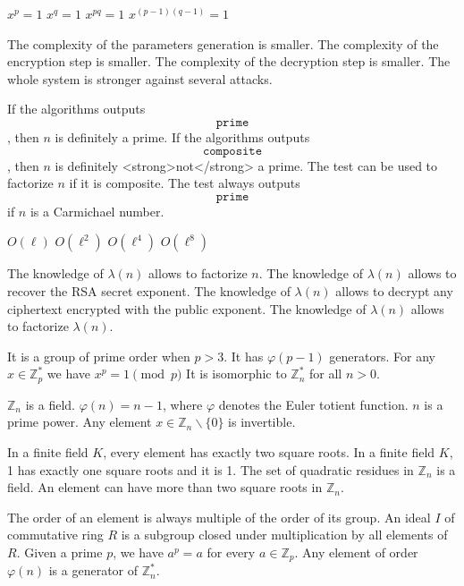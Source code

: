 {$x^{p} = 1$} 
{$x^{q} = 1$}
{$x^{pq} = 1$}
{$x^{(p-1)(q-1)} = 1$} 

{The complexity of the parameters generation is smaller.} 
{The complexity of the encryption step is smaller.}
{The complexity of the decryption step is smaller.}
{The whole system is stronger against several attacks.} 

{If the algorithms outputs $$ \texttt{prime} $$, then $n$ is definitely a prime.} 
{If the algorithms outputs $$ \texttt{composite} $$, then $n$ is definitely <strong>not</strong> a prime.}
{The test can be used to factorize $n$ if it is composite.}
{The test always outputs $$ \texttt{prime} $$ if $n$ is a Carmichael number.} 

{$O(\ell)$} 
{$O(\ell^2)$}
{$O(\ell^4)$}
{$O(\ell^8)$} 

{The knowledge of $\lambda(n)$ allows to factorize $n$.}
{The knowledge of $\lambda(n)$ allows to recover the RSA secret exponent.}
{The knowledge of $\lambda(n)$ allows to decrypt any ciphertext encrypted with the public exponent.}
{The knowledge of $\lambda(n)$ allows to factorize $\lambda(n)$.}


 {It is a group of prime order when $p>3$.}
 {It has $\varphi(p-1)$ generators.}
 {For any $x \in \mathbb{Z}_p^*$ we have $x^{p}=1 \pmod p$}
 {It is isomorphic to $\mathbb{Z}_n^*$ for all $n >0$.}

{$\mathbb{Z}_n$ is a field.} 
{$\varphi(n)=n-1 $, where $\varphi$ denotes the Euler totient function.} 
{$n$ is a prime power.} 
{Any element $x \in \mathbb{Z}_n \backslash \{0\}$ is invertible.}


 {In a finite field $K$, every element has exactly two square roots.}
 {In a finite field $K$, 1 has exactly one square roots and it is 1.}
 {The set of quadratic residues in $\mathbb{Z}_n$ is a field.}
 {An element can have more than two square roots in $\mathbb{Z}_n$.}
 
 {The order of an element is always multiple of the order of its group.}
 {An ideal $I$ of commutative ring $R$ is a subgroup closed under multiplication by all elements of $R$.}
 {Given a prime $p$, we have $a^{p} = a$ for every $a \in \mathbb{Z}_p$.}
 {Any element of order $\varphi(n)$ is a generator of $\mathbb{Z}_n^*$.}
 
 
